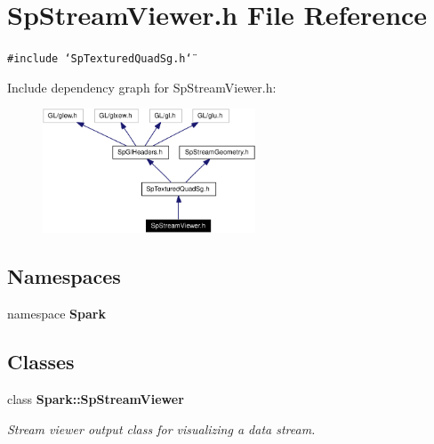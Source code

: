 \section{Sp\-Stream\-Viewer.h File Reference}
\label{SpStreamViewer_8h}
{\tt \#include \char`\"{}Sp\-Textured\-Quad\-Sg.h\char`\"{}}\par


Include dependency graph for Sp\-Stream\-Viewer.h:\begin{figure}[H]
\begin{center}
\leavevmode
\includegraphics[width=179pt]{SpStreamViewer_8h__incl}
\end{center}
\end{figure}
\subsection*{Namespaces}
\begin{CompactItemize}
\item 
namespace {\bf Spark}
\end{CompactItemize}
\subsection*{Classes}
\begin{CompactItemize}
\item 
class {\bf Spark::Sp\-Stream\-Viewer}
\begin{CompactList}\small\item\em Stream viewer output class for visualizing a data stream. \item\end{CompactList}\end{CompactItemize}
